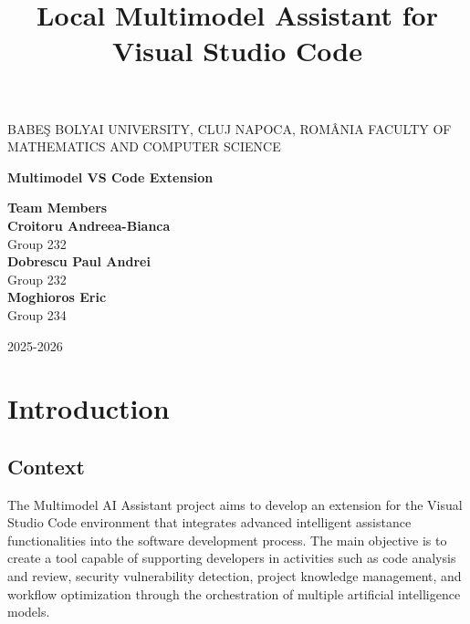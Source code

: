 \documentclass[12pt,a4paper]{article}
\title{\textbf{Local Multimodel Assistant for Visual Studio Code}}
\date{}
\begin{document}
\begin{titlepage}
    \centering
    BABE\c S BOLYAI UNIVERSITY, CLUJ NAPOCA, ROM\^ ANIA
    FACULTY OF MATHEMATICS AND COMPUTER SCIENCE
    \vspace*{4cm}

    {\Huge\textbf{Multimodel VS Code Extension}}\\[2cm]

    \vspace{5cm}

    \begin{flushright}
        {\Large\textbf{Team Members}}\\[1cm]
        \textbf{Croitoru Andreea-Bianca} \\ Group 232 \\[0.3cm]
        \textbf{Dobrescu Paul Andrei} \\ Group 232 \\[0.3cm]
        \textbf{Moghioros Eric} \\ Group 234
    \end{flushright}

    \vspace*{3cm}
    2025-2026

\end{titlepage}

\newpage
\tableofcontents


\newpage
{}
\pagestyle{plain}

\maketitle

\section{Introduction}

\subsection{Context}

The Multimodel AI Assistant project aims to develop an extension for the Visual Studio Code environment that integrates 
advanced intelligent assistance functionalities into the software development process. The main objective is to create a 
tool capable of supporting developers in activities such as code analysis and review, security vulnerability detection, 
project knowledge management, and workflow optimization through the orchestration of multiple artificial intelligence 
models.
\end{document}
